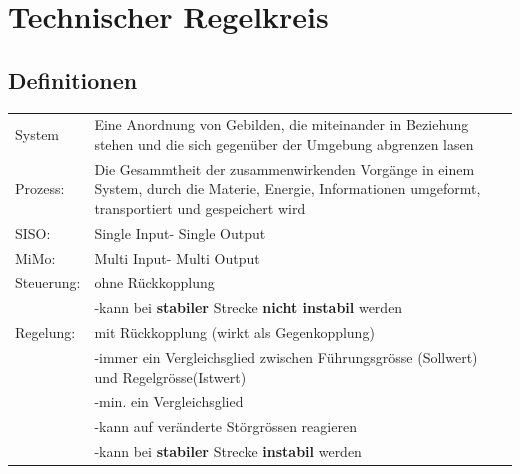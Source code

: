\newcommand{\titleinfo}{Regelungstechnik 1 - Formelsammlung}
\newcommand{\authorinfo}{Braun \& Co, J.Rast}
\newcommand{\versioninfo}{$Revision: 1 $ - powered by \LaTeX}

%





\setlength{\parindent}{0pt}
 \section{Technischer Regelkreis}
 \subsection{Definitionen }
	\begin{tabular}{ p{1.5cm} p{15.5cm}}
        System 		&Eine Anordnung von Gebilden, die miteinander in Beziehung stehen
        			und die sich gegenüber der Umgebung abgrenzen lasen\\
        Prozess:	&Die Gesammtheit der zusammenwirkenden Vorgänge in einem System,
        			durch die Materie, Energie, Informationen umgeformt, transportiert und gespeichert wird\\

        SISO:		&Single Input- Single Output\\
        MiMo:		&Multi Input- Multi Output\\
        Steuerung:	&ohne Rückkopplung\\
        			&	-kann bei {\bf stabiler} Strecke {\bf nicht instabil} werden\\
        Regelung:	&mit Rückkopplung (wirkt als Gegenkopplung)\\
        			&	-immer ein Vergleichsglied zwischen Führungsgrösse (Sollwert) und
        			Regelgrösse(Istwert)\\
        			&	-min. ein Vergleichsglied\\
        			&	-kann auf veränderte Störgrössen reagieren\\
        			&	-kann bei {\bf stabiler} Strecke {\bf instabil} werden\\ 

    \end{tabular}

